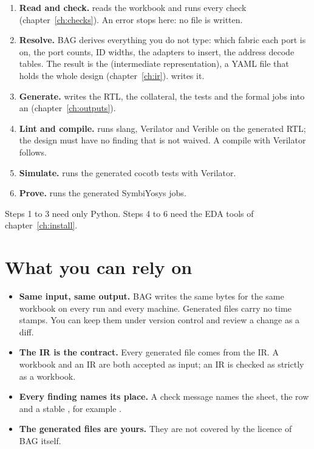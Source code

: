 \begin{enumerate}
\item \textbf{Read and check.}  reads the workbook and runs every check
  (chapter~\ref{ch:checks}). An error stops here: no file is written.
\item \textbf{Resolve.} BAG derives everything you do not type: which fabric each port
  is on, the port counts, ID widths, the adapters to insert, the address decode tables.
  The result is the  (intermediate representation), a YAML file that holds the
  whole design (chapter~\ref{ch:ir}).  writes it.
\item \textbf{Generate.}  writes the RTL, the collateral, the tests and
  the formal jobs into an  (chapter~\ref{ch:outputs}).
\item \textbf{Lint and compile.}  runs slang, Verilator and Verible on the
  generated RTL; the design must have no finding that is not waived. A compile with
  Verilator follows.
\item \textbf{Simulate.}  runs the generated cocotb tests with Verilator.
\item \textbf{Prove.}  runs the generated SymbiYosys jobs.
\end{enumerate}

Steps 1 to 3 need only Python. Steps 4 to 6 need the EDA tools of
chapter~\ref{ch:install}.

\section{What you can rely on}

\begin{itemize}
\item \textbf{Same input, same output.} BAG writes the same bytes for the same workbook
  on every run and every machine. Generated files carry no time stamps. You can keep
  them under version control and review a change as a diff.
\item \textbf{The IR is the contract.} Every generated file comes from the IR. A
  workbook and an IR are both accepted as input; an IR is checked as strictly as a
  workbook.
\item \textbf{Every finding names its place.} A check message names the sheet, the row
  and a stable , for example .
\item \textbf{The generated files are yours.} They are not covered by the licence of
  BAG itself.
\end{itemize}

